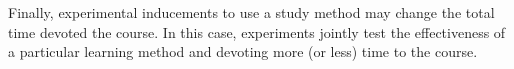 \documentclass[12pt]{article}
\begin{document}
Finally, experimental inducements to use a study method may change the total time devoted the course. In this case, experiments jointly test the effectiveness of a particular learning method and devoting more (or less) time to the course.

\end{document}

